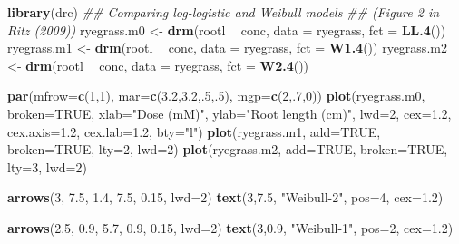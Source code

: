 \documentclass[letterpaper,]{book}
\newenvironment{Shaded}{\begin{snugshade}}{\end{snugshade}}
\newcommand{\CommentTok}[1]{\textcolor[rgb]{0.56,0.35,0.01}{\textit{#1}}}
\newcommand{\DataTypeTok}[1]{\textcolor[rgb]{0.13,0.29,0.53}{#1}}
\newcommand{\DecValTok}[1]{\textcolor[rgb]{0.00,0.00,0.81}{#1}}
\newcommand{\FloatTok}[1]{\textcolor[rgb]{0.00,0.00,0.81}{#1}}
\newcommand{\KeywordTok}[1]{\textcolor[rgb]{0.13,0.29,0.53}{\textbf{#1}}}
\newcommand{\NormalTok}[1]{#1}
\newcommand{\OperatorTok}[1]{\textcolor[rgb]{0.81,0.36,0.00}{\textbf{#1}}}
\newcommand{\OtherTok}[1]{\textcolor[rgb]{0.56,0.35,0.01}{#1}}
\newcommand{\StringTok}[1]{\textcolor[rgb]{0.31,0.60,0.02}{#1}}
\begin{document}
\begin{Shaded}
\begin{Highlighting}[]
\KeywordTok{library}\NormalTok{(drc)}
\CommentTok{## Comparing log-logistic and Weibull models}
\CommentTok{## (Figure 2 in Ritz (2009))}
\NormalTok{ryegrass.m0 <-}\StringTok{ }\KeywordTok{drm}\NormalTok{(rootl }\OperatorTok{~}\StringTok{ }\NormalTok{conc, }\DataTypeTok{data =}\NormalTok{ ryegrass, }\DataTypeTok{fct =} \KeywordTok{LL.4}\NormalTok{())}
\NormalTok{ryegrass.m1 <-}\StringTok{ }\KeywordTok{drm}\NormalTok{(rootl }\OperatorTok{~}\StringTok{ }\NormalTok{conc, }\DataTypeTok{data =}\NormalTok{ ryegrass, }\DataTypeTok{fct =} \KeywordTok{W1.4}\NormalTok{())}
\NormalTok{ryegrass.m2 <-}\StringTok{ }\KeywordTok{drm}\NormalTok{(rootl }\OperatorTok{~}\StringTok{ }\NormalTok{conc, }\DataTypeTok{data =}\NormalTok{ ryegrass, }\DataTypeTok{fct =} \KeywordTok{W2.4}\NormalTok{())}

\KeywordTok{par}\NormalTok{(}\DataTypeTok{mfrow=}\KeywordTok{c}\NormalTok{(}\DecValTok{1}\NormalTok{,}\DecValTok{1}\NormalTok{), }\DataTypeTok{mar=}\KeywordTok{c}\NormalTok{(}\FloatTok{3.2}\NormalTok{,}\FloatTok{3.2}\NormalTok{,.}\DecValTok{5}\NormalTok{,.}\DecValTok{5}\NormalTok{), }\DataTypeTok{mgp=}\KeywordTok{c}\NormalTok{(}\DecValTok{2}\NormalTok{,.}\DecValTok{7}\NormalTok{,}\DecValTok{0}\NormalTok{))}
\KeywordTok{plot}\NormalTok{(ryegrass.m0, }\DataTypeTok{broken=}\OtherTok{TRUE}\NormalTok{, }\DataTypeTok{xlab=}\StringTok{"Dose (mM)"}\NormalTok{, }\DataTypeTok{ylab=}\StringTok{"Root length (cm)"}\NormalTok{, }\DataTypeTok{lwd=}\DecValTok{2}\NormalTok{, }
     \DataTypeTok{cex=}\FloatTok{1.2}\NormalTok{, }\DataTypeTok{cex.axis=}\FloatTok{1.2}\NormalTok{, }\DataTypeTok{cex.lab=}\FloatTok{1.2}\NormalTok{, }\DataTypeTok{bty=}\StringTok{"l"}\NormalTok{)}
\KeywordTok{plot}\NormalTok{(ryegrass.m1, }\DataTypeTok{add=}\OtherTok{TRUE}\NormalTok{, }\DataTypeTok{broken=}\OtherTok{TRUE}\NormalTok{, }\DataTypeTok{lty=}\DecValTok{2}\NormalTok{, }\DataTypeTok{lwd=}\DecValTok{2}\NormalTok{)}
\KeywordTok{plot}\NormalTok{(ryegrass.m2, }\DataTypeTok{add=}\OtherTok{TRUE}\NormalTok{, }\DataTypeTok{broken=}\OtherTok{TRUE}\NormalTok{, }\DataTypeTok{lty=}\DecValTok{3}\NormalTok{, }\DataTypeTok{lwd=}\DecValTok{2}\NormalTok{)}

\KeywordTok{arrows}\NormalTok{(}\DecValTok{3}\NormalTok{, }\FloatTok{7.5}\NormalTok{, }\FloatTok{1.4}\NormalTok{, }\FloatTok{7.5}\NormalTok{, }\FloatTok{0.15}\NormalTok{, }\DataTypeTok{lwd=}\DecValTok{2}\NormalTok{)}
\KeywordTok{text}\NormalTok{(}\DecValTok{3}\NormalTok{,}\FloatTok{7.5}\NormalTok{, }\StringTok{"Weibull-2"}\NormalTok{, }\DataTypeTok{pos=}\DecValTok{4}\NormalTok{, }\DataTypeTok{cex=}\FloatTok{1.2}\NormalTok{)}

\KeywordTok{arrows}\NormalTok{(}\FloatTok{2.5}\NormalTok{, }\FloatTok{0.9}\NormalTok{, }\FloatTok{5.7}\NormalTok{, }\FloatTok{0.9}\NormalTok{, }\FloatTok{0.15}\NormalTok{, }\DataTypeTok{lwd=}\DecValTok{2}\NormalTok{)}
\KeywordTok{text}\NormalTok{(}\DecValTok{3}\NormalTok{,}\FloatTok{0.9}\NormalTok{, }\StringTok{"Weibull-1"}\NormalTok{, }\DataTypeTok{pos=}\DecValTok{2}\NormalTok{, }\DataTypeTok{cex=}\FloatTok{1.2}\NormalTok{)}
\end{Highlighting}
\end{Shaded}
\end{document}
